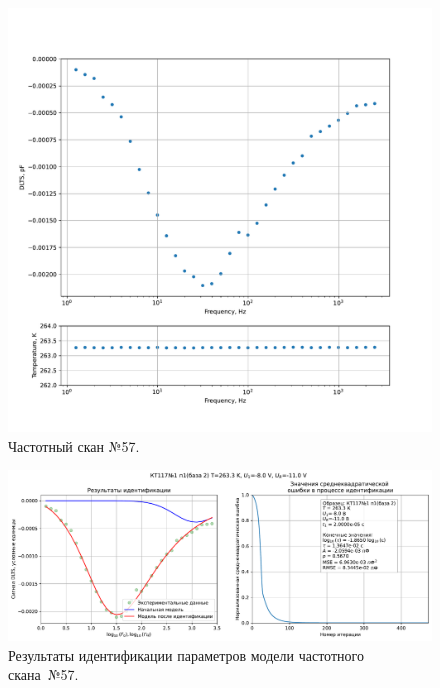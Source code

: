 \begin{figure}[!ht]
    \centering
    \includegraphics[width=1\textwidth]{../plots/КТ117№1_п1(база 2)_2500Гц-1Гц_1пФ_-10С_-8В-11В_50мВ_20мкс_шаг_0,1.pdf}
    \caption{Частотный скан №57.}
    \label{pic:frequency_scan_57}
\end{figure}

\begin{figure}[!ht]
    \centering
    \includegraphics[width=1\textwidth]{../plots/КТ117№1_п1(база 2)_2500Гц-1Гц_1пФ_-10С_-8В-11В_50мВ_20мкс_шаг_0,1_model.pdf}
    \caption{Результаты идентификации параметров модели частотного скана~№57.}
    \label{pic:frequency_scan_model57}
\end{figure}

\pagebreak


